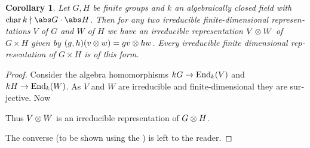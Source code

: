 \documentclass[12pt,a4paper]{scrartcl}
\theoremstyle{cplain}
\newtheorem{cor}[thmcounter]{Corollary}
\theoremstyle{cplain}
\theoremstyle{cplain}
\theoremstyle{definition}
\begin{document}
\begin{otherlanguage}{english}
\begin{cor}
  Let $G,H$ be finite groups and $k$ an algebraically closed field with $\chr k \nmid \abs G \cdot \abs H$. Then for any two irreducible finite-dimensional representations $V$ of $G$ and $W$ of $H$ we have an irreducible representation $V \otimes W$ of $G \times H$ given by $(g,h)(v\otimes w) = gv \otimes hw$. Every irreducible finite dimensional representation of $G\times H$ is of this form.
\end{cor}
\begin{proof}
  Consider the algebra homomorphisms $kG \to \operatorname{End}_k(V)$ and $kH \to \operatorname{End}_k(W)$. As $V$ and $W$ are irreducible and finite-dimensional they are surjective. Now
  \begin{center}
  \end{center}
  Thus $V \otimes W$ is an irreducible representation of $G \otimes H$. %
  
  The converse (to be shown using the ) is left to the reader.
\end{proof}


\end{otherlanguage}
\end{document}
